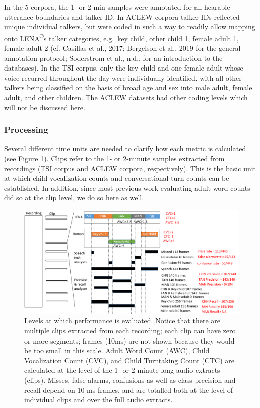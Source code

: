 \documentclass[english,table,man,floatsintext]{apa6}
\begin{document}
In the 5 corpora, the 1- or 2-min samples were annotated for all hearable utterance boundaries and talker ID. In ACLEW corpora talker IDs reflected unique individual talkers, but were coded in such a way to readily allow mapping onto LENA\textsuperscript{®}s talker categories, e.g.~key child, other child 1, female adult 1, female adult 2 (cf. Casillas et al., 2017; Bergelson et al., 2019 for the general annotation protocol; Soderstrom et al., n.d., for an introduction to the databases). In the TSI corpus, only the key child and one female adult whose voice recurred throughout the day were individually identified, with all other talkers being classified on the basis of broad age and sex into male adult, female adult, and other children. The ACLEW datasets had other coding levels which will not be discussed here.

\hypertarget{processing}{%
\subsubsection{Processing}\label{processing}}

Several different time units are needed to clarify how each metric is calculated (see Figure 1). Clips refer to the 1- or 2-minute samples extracted from recordings (TSI corpus and ACLEW corpora, respectively). This is the basic unit at which child vocalization counts and conversational turn counts can be established. In addition, since most previous work evaluating adult word counts did so at the clip level, we do so here as well.

\begin{figure}
\centering
\includegraphics{fig_levels.pdf}
\caption{Levels at which performance is evaluated. Notice that there are multiple clips extracted from each recording; each clip can have zero or more segments; frames (10ms) are not shown because they would be too small in this scale. Adult Word Count (AWC), Child Vocalization Count (CVC), and Child Turntaking Count (CTC) are calculated at the level of the 1- or 2-minute long audio extracts (clips). Misses, false alarms, confusions as well as class precision and recall depend on 10-ms frames, and are totalled both at the level of individual clips and over the full audio extracts.}
\end{figure}
\end{document}
